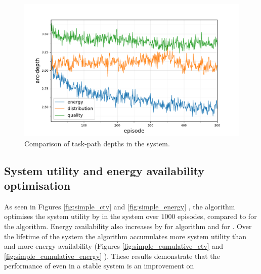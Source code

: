 \begin{figure}[ht]
	\begin{minipage}{.49\textwidth}
		\centering
		\includegraphics[width=1.0\linewidth,trim={25pt 0pt 50pt 0pt},clip]{5.19_ctv-arc-depth-comparison}
		\caption{Comparison of task-path depths  in the \simulationExtended{}{} system.}
		\label{fig:extended_arc_depth}
	\end{minipage}\hfill%
\begin{minipage}{.49\textwidth}
\end{minipage}
\end{figure}

\subsection{System utility and energy availability optimisation}
As seen in Figures \ref{fig:simple_ctv} and \ref{fig:simple_energy} , the \algorithmBalanced{}{} algorithm optimises the system utility by \resultsSimpleCTVBalancedDiff{}{}  in the \simulationSimple{}{} system over $1000$ episodes, compared to \resultsSimpleCTVQRoutingDiff{}{} for the \algorithmQRouting{}{} algorithm. Energy availability also increases by \resultsSimpleEnergyBalancedDiff{}{} for \algorithmBalanced{}{} algorithm and \resultsSimpleEnergyQRoutingDiff{}{} for \algorithmQRouting{}{}. Over the lifetime of the system the \algorithmBalanced{}{} algorithm accumulates \resultsSimpleCumulativeCTVComparison{}{} more system utility than \algorithmQRouting{}{} and \resultsSimpleCumulativeEnergyComparison{}{} more energy availability (Figures \ref{fig:simple_cumulative_ctv} and \ref{fig:simple_cumulative_energy} ). These results demonstrate that the performance of \acronymWSNOptimisation{}{} even in a stable system is an improvement on \acronymQRouting{}{}

